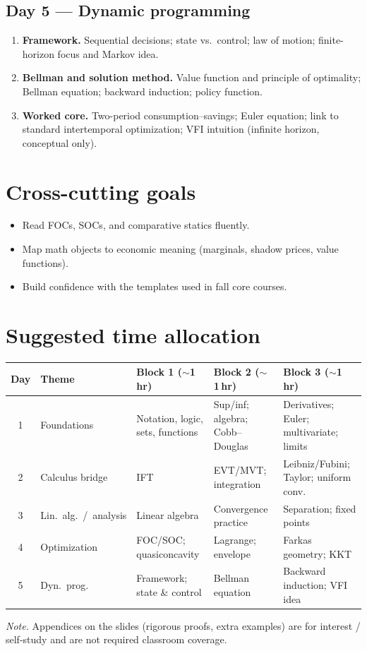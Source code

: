 \documentclass[11pt,a4paper]{article}
\begin{document}
\subsection*{Day 5 --- Dynamic programming}
\begin{enumerate}
  \item \textbf{Framework.} Sequential decisions; state vs.\ control; law of motion; finite-horizon focus and Markov idea.
  \item \textbf{Bellman and solution method.} Value function and principle of optimality; Bellman equation; backward induction; policy function.
  \item \textbf{Worked core.} Two-period consumption--savings; Euler equation; link to standard intertemporal optimization; VFI intuition (infinite horizon, conceptual only).
\end{enumerate}

\section*{Cross-cutting goals}
\begin{itemize}
  \item Read FOCs, SOCs, and comparative statics fluently.
  \item Map math objects to economic meaning (marginals, shadow prices, value functions).
  \item Build confidence with the templates used in fall core courses.
\end{itemize}

\section*{Suggested time allocation}

\begin{center}
\footnotesize
\setlength{\tabcolsep}{4pt}
\begin{tabular}{@{}clp{}p{}p{}@{}}
\toprule
Day & Theme & Block 1 ($\sim$1\,hr) & Block 2 ($\sim$1\,hr) & Block 3 ($\sim$1\,hr) \\
\midrule
1 & Foundations & Notation, logic, sets, functions & Sup/inf; algebra; Cobb--Douglas & Derivatives; Euler; multivariate; limits \\
2 & Calculus bridge & IFT & EVT/MVT; integration & Leibniz/Fubini; Taylor; uniform conv. \\
3 & Lin.\ alg.\ /\ analysis & Linear algebra & Convergence practice & Separation; fixed points \\
4 & Optimization & FOC/SOC; quasiconcavity & Lagrange; envelope & Farkas geometry; KKT \\
5 & Dyn.\ prog. & Framework; state \& control & Bellman equation & Backward induction; VFI idea \\
\bottomrule
\end{tabular}
\end{center}

\vspace{0.6em}
\noindent\textit{Note.} Appendices on the slides (rigorous proofs, extra examples) are for interest / self-study and are not required classroom coverage.
\end{document}
